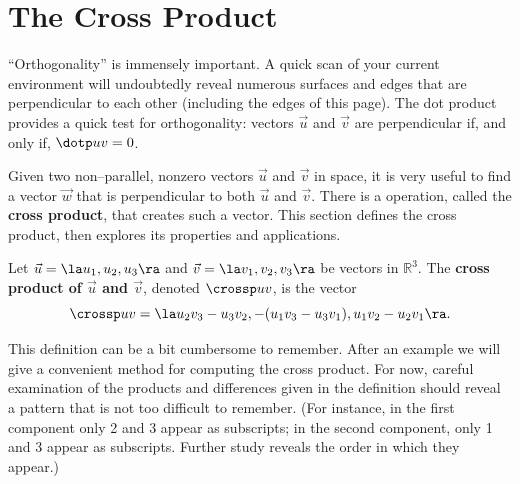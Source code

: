 \section{The Cross Product}\label{sec:cross_product}

``Orthogonality'' is immensely important. A quick scan of your current environment will undoubtedly reveal numerous surfaces and edges that are perpendicular to each other (including the edges of this page). The dot product provides a quick test for orthogonality:  vectors $\vec u$ and $\vec v$ are perpendicular if, and only if, $\dotp uv=0$. 

Given two non--parallel, nonzero vectors $\vec u$ and $\vec v$ in space, it is very useful to find a vector $\vec w$ that is perpendicular to both $\vec u$ and $\vec v$. There is a operation, called the \textbf{cross product}, that creates such a vector. This section defines the cross product, then explores its properties and applications.

{Let $\vec u =\la u_1,u_2,u_3\ra$ and $\vec v = \la v_1,v_2,v_3\ra$ be vectors in $\mathbb{R}^3$. The \textbf{cross product of $\vec u$ and $\vec v$}, denoted $\crossp uv$, is the vector
\[
\crossp uv = \la u_2v_3-u_3v_2,-(u_1v_3-u_3v_1),u_1v_2-u_2v_1\ra.
\]
}


This definition can be a bit cumbersome to remember. After an example we will give a convenient method for computing the cross product. For now, careful examination of the products and differences given in the definition should reveal a pattern that is not too difficult to remember. (For instance, in the first component only 2 and 3 appear as subscripts; in the second component, only 1 and 3 appear as subscripts. Further study reveals the order in which they appear.)

